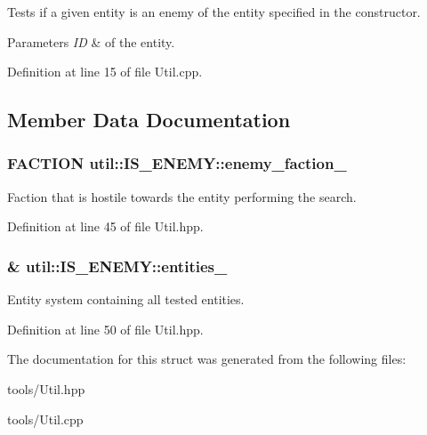 Tests if a given entity is an enemy of the entity specified in the constructor. 


\begin{DoxyParams}{Parameters}
{\em ID} & of the entity. \\
\hline
\end{DoxyParams}


Definition at line 15 of file Util.\+cpp.



\subsection{Member Data Documentation}
\subsubsection[{\texorpdfstring{enemy\+\_\+faction\+\_\+}{enemy_faction_}}]{\setlength{\rightskip}{0pt plus 5cm}F\+A\+C\+T\+I\+ON util\+::\+I\+S\+\_\+\+E\+N\+E\+M\+Y\+::enemy\+\_\+faction\+\_\+\hspace{0.3cm}{\ttfamily [private]}}\hypertarget{structutil_1_1_i_s___e_n_e_m_y_a09fbb6f1493368930f44f227f939e64f}{}\label{structutil_1_1_i_s___e_n_e_m_y_a09fbb6f1493368930f44f227f939e64f}


Faction that is hostile towards the entity performing the search. 



Definition at line 45 of file Util.\+hpp.

\subsubsection[{\texorpdfstring{entities\+\_\+}{entities_}}]{\& util\+::\+I\+S\+\_\+\+E\+N\+E\+M\+Y\+::entities\+\_\+\hspace{0.3cm}{\ttfamily [private]}}\hypertarget{structutil_1_1_i_s___e_n_e_m_y_ad78c8273836b1ebca3e67e116194ad8a}{}\label{structutil_1_1_i_s___e_n_e_m_y_ad78c8273836b1ebca3e67e116194ad8a}


Entity system containing all tested entities. 



Definition at line 50 of file Util.\+hpp.



The documentation for this struct was generated from the following files\+:\begin{DoxyCompactItemize}
\item 
tools/Util.\+hpp\item 
tools/Util.\+cpp\end{DoxyCompactItemize}
